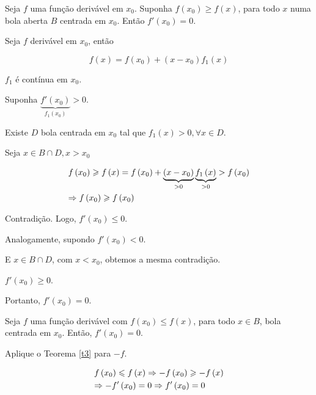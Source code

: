 \documentclass{book}
\begin{document}
\begin{teo}
\label{t3}
Seja $f$ uma fun\c c\~ao deriv\'avel em $x_0$. Suponha $f\left( {x_0 } \right) \geqslant f\left( x \right)$, para todo $x$ numa bola aberta $B$ centrada em $x_0$. Ent\~ao $f'\left( {x_0 } \right) = 0$.
\end{teo}

\begin{dem}
Seja $f$ deriv\'avel em $x_0$, ent\~ao

\[
    f\left( x \right) = f\left( {x_0 } \right) + \left( {x - x_0 } \right)f_1 \left( x \right)
\]

$f_1$ \'e cont\'inua em $x_0$.

    Suponha $\underbrace {f'\left( {x_0 } \right)}_{f_1 \left( {x_0 } \right)} > 0$.

    Existe $D$ bola centrada em $x_0$ tal que $f_1 \left( x \right) > 0,\forall x \in D$.

Seja $x \in B \cap D,x > x_0$

\[
\begin{gathered}
      f\left( {x_0 } \right) \geqslant f\left( x \right) = f\left( {x_0 } \right) + \underbrace {\left( {x - x_0 } \right)}_{ > 0}\underbrace {f_1 \left( x \right)}_{ > 0} > f\left( {x_0 } \right) \hfill \\
       \Rightarrow f\left( {x_0 } \right) \geqslant f\left( {x_0 } \right) \hfill \\
\end{gathered}
\]

Contradi\c c\~ao. Logo, $f'\left( {x_0 } \right) \leqslant 0$.

Analogamente, supondo $f'\left( {x_0 } \right) < 0$.

E $x \in B \cap D$, com $x < x_0$, obtemos a mesma contradi\c c\~ao.

$f'\left( {x_0 } \right) \geqslant 0$.

Portanto, $f'\left( {x_0 } \right) = 0$.
\end{dem}

\begin{teo}
    Seja $f$ uma fun\c c\~ao deriv\'avel com $f\left( {x_0 } \right) \leqslant f\left( x \right)$, para todo $x \in B$, bola centrada em $x_0$. Ent\~ao, $f'\left( {x_0 } \right) = 0$.
\end{teo}

\begin{dem}
Aplique o Teorema \ref{t3} para $-f$.

\[
\begin{gathered}
  f\left( {x_0 } \right) \leqslant f\left( x \right) \Rightarrow  - f\left( {x_0 } \right) \geqslant  - f\left( x \right) \hfill \\
   \Rightarrow  - f'\left( {x_0 } \right) = 0 \Rightarrow f'\left( {x_0 } \right) = 0 \hfill \\
\end{gathered}
\]

\end{dem}
\end{document}
